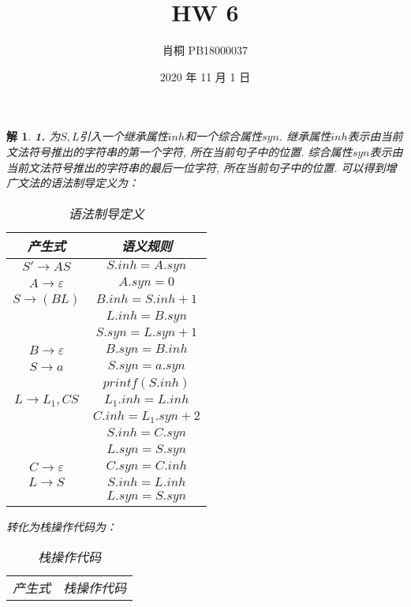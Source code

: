\documentclass{article}
\begin{document}
	\title{HW 6}
	\author{肖桐 PB18000037}
	\date{2020 年 11 月 1 日}
	\maketitle

	\newtheorem*{solution}{解}

	\begin{solution}\textnormal{\textbf{1.}}
		为$S, L$引入一个继承属性$inh$和一个综合属性$syn$.\newline
		继承属性$inh$表示由当前文法符号推出的字符串的第一个字符, 所在当前句子中的位置.\newline
		综合属性$syn$表示由当前文法符号推出的字符串的最后一位字符, 所在当前句子中的位置.\newline
		可以得到增广文法的语法制导定义为：
		\begin{table}[H]
			\centering
			\caption{语法制导定义}
			\begin{tabular}{|c|c|}
				\hline
				产生式 & 语义规则 \\
				\hline
				$S' \to AS$ & $S.inh = A.syn$ \\
				\hline
				$A \to \varepsilon$ & $A.syn = 0$ \\
				\hline
				$S \to (BL)$ & $B.inh = S.inh + 1$ \\
				& $L.inh = B.syn$ \\
				& $S.syn = L.syn + 1$ \\
				\hline
				$B \to \varepsilon$ & $B.syn = B.inh$ \\
				\hline
				$S \to a$ & $S.syn = a.syn$ \\
				& $printf(S.inh)$ \\
				\hline
				$L \to L_1, CS$ & $L_1.inh = L.inh$ \\
				& $C.inh = L_1.syn + 2$ \\
				& $S.inh = C.syn$ \\
				& $L.syn = S.syn$ \\
				\hline
				$C \to \varepsilon$ & $C.syn = C.inh$ \\
				\hline
				$L \to S$ & $S.inh = L.inh$ \\
				& $L.syn = S.syn$ \\
				\hline
			\end{tabular}
		\end{table}
		转化为栈操作代码为：
		\begin{table}[H]
			\centering
			\caption{栈操作代码}
			\begin{tabular}{|c|c|}
				\hline
				产生式 & 栈操作代码 \\

\end{tabular}
\end{table}
\end{solution}
\end{document}
